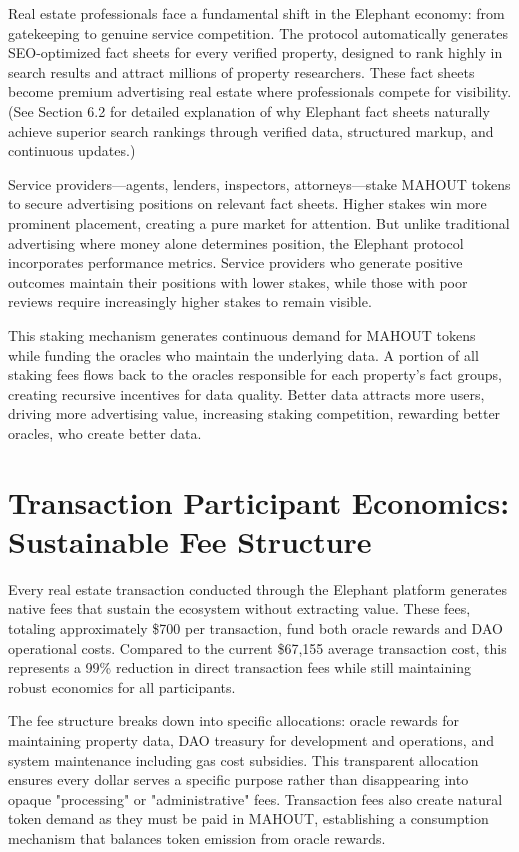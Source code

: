 Real estate professionals face a fundamental shift in the Elephant economy: from gatekeeping to genuine service competition. The protocol automatically generates SEO-optimized fact sheets for every verified property, designed to rank highly in search results and attract millions of property researchers. These fact sheets become premium advertising real estate where professionals compete for visibility. (See Section 6.2 for detailed explanation of why Elephant fact sheets naturally achieve superior search rankings through verified data, structured markup, and continuous updates.)

Service providers—agents, lenders, inspectors, attorneys—stake MAHOUT tokens to secure advertising positions on relevant fact sheets. Higher stakes win more prominent placement, creating a pure market for attention. But unlike traditional advertising where money alone determines position, the Elephant protocol incorporates performance metrics. Service providers who generate positive outcomes maintain their positions with lower stakes, while those with poor reviews require increasingly higher stakes to remain visible.

This staking mechanism generates continuous demand for MAHOUT tokens while funding the oracles who maintain the underlying data. A portion of all staking fees flows back to the oracles responsible for each property's fact groups, creating recursive incentives for data quality. Better data attracts more users, driving more advertising value, increasing staking competition, rewarding better oracles, who create better data.

\section{Transaction Participant Economics: Sustainable Fee Structure}

Every real estate transaction conducted through the Elephant platform generates native fees that sustain the ecosystem without extracting value. These fees, totaling approximately \$700 per transaction, fund both oracle rewards and DAO operational costs. Compared to the current \$67,155 average transaction cost, this represents a 99\% reduction in direct transaction fees while still maintaining robust economics for all participants.

The fee structure breaks down into specific allocations: oracle rewards for maintaining property data, DAO treasury for development and operations, and system maintenance including gas cost subsidies. This transparent allocation ensures every dollar serves a specific purpose rather than disappearing into opaque "processing" or "administrative" fees. Transaction fees also create natural token demand as they must be paid in MAHOUT, establishing a consumption mechanism that balances token emission from oracle rewards.

